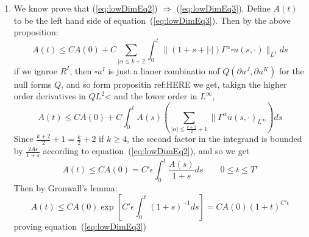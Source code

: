 \documentclass{book}
\newenvironment{Proof}[1][]
  {\begin{ProofTcb}[#1]}
  {\end{ProofTcb}}
\newcommand{\Rw}{\Rightarrow}
\begin{document}
\begin{Proof}
\begin{enumerate}
				To that end, fix $T \in E$> By continuity of the left hand side of step 2 (note that
				$\Gamma^\alpha u$ is smooth and compactly supported in $x$ On $[0, T']$< by
				Huygen's principle), there certainly exists $T' > T$ such that
				\begin{equation}\label{eq:lowDimEq2}
				  \sum_{|\alpha| \le k} \|\Gamma^\alpha u(t, \cdot)\|_{L^\infty} \le
				  \frac{2A\epsilon}{1+T} \qquad \text{for} \qquad  0 \le t \le T'
				\end{equation}
				The idea now is to use a boot-strap argument to show that we have the stronger
				estimate shown in step 2 on $[0, T']$. It then will follow that $T' \in E$, proving
				that $E$ is open. To prove the above estimate implies the estaimte in step 2 when
				$\epsilon$ is sufficinelty small, we first show that the abveo estiamte implies
				\begin{equation}\label{eq:lowDimEq3}
				  \sum_{|\alpha| \le k+3} \|\Gamma^\alpha u(t, \cdot)\|_{L^2} \le C_0(1
				  + t)^{C_1\epsilon} \sum_{|\alpha| \le k+3} \|\Gamma^\alpha u(0, \cdot)\|_{L^2}
				\end{equation}
				for $0 \le t \le T'$ where $C_0$ and $C_1$ are absoltue constants. Then we prove that
				the above implies the estimate in step $1$ if $\epsilon$ is sufficeintly small.
			\item We know prove that (\ref{eq:lowDimEq2}) $\Rw$ (\ref{eq:lowDimEq3}). Define $A(t)$ to be
				the left hand side of equation~(\ref{eq:lowDimEq3}). Then by the above
				proposition:
				\[
					A(t) \le CA(0) + C\sum_{|\alpha \le k+2} \int_0^t \|(1
					+s+|\cdot|)\Gamma^\alpha \square u(s, \cdot)\|_{L^2} ds
				\]
				if we ignroe $R^I$, then $\square u^I$ is just a lianer combinatio nof $Q( \partial u^J,
				\partial u^K)$ for the null forms $Q$, and so form propositin ref:HERE we get, takign
				the higher order derivatives in $QL^2$< and the lower order in $L^\infty$,
				\[
					A(t) \le CA(0) + C\int_0^t A(s) \left( \sum_{|\alpha| \le \frac{k+2}{2}+1}
					\|\Gamma^\alpha u(s, \cdot)_{L^\infty}\right) ds
				\]
				Since $\frac{k+2}{2} + 1 = \frac{k}{2}+2$ if $k \ge 4$, the second factor in the
				integrand is bounded by $\frac{2A\epsilon}{1+s}$ according to
				equation~(\ref{eq:lowDimEq2}), and so we get
				\[
					A(t) \le CA(0) = C'\epsilon \int_0^t \frac{A(s)}{1+s}ds \qquad 0 \le
					t \le T'
				\]
				Then by Gronwall's lemma:
				\[
					A(t) \le C A(0) \exp\left[ C'\epsilon \int_0^t (1+s)^{-1}ds\right]
					= CA(0)(1+t)^{C'\epsilon}
				\]
				proving equation~(\ref{eq:lowDimEq3})

\end{enumerate}
\end{Proof}
\end{document}
